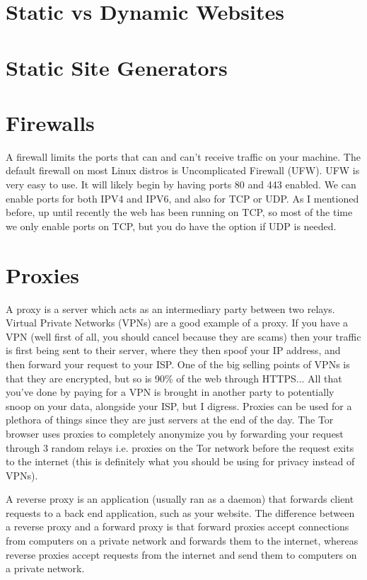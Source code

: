 \documentclass{article}
\begin{document}
\section{Static vs Dynamic Websites}

\section{Static Site Generators}

\section{Firewalls}

A firewall limits the ports that can and can't receive traffic on your machine. The default firewall on most
Linux distros is Uncomplicated Firewall (UFW). UFW is very easy to use. It will likely begin by having ports
80 and 443 enabled. We can enable ports for both IPV4 and IPV6, and also for TCP or UDP. As I mentioned before,
up until recently the web has been running on TCP, so most of the time we only enable ports on TCP, but you do
have the option if UDP is needed.

\section{Proxies}

A proxy is a server which acts as an intermediary party between two relays. Virtual Private Networks (VPNs) are
a good example of a proxy. If you have a VPN (well first of all, you should cancel because they are scams)
then your traffic is first being sent to their server, where they then spoof your IP address, and then forward
your request to your ISP. One of the big selling points of VPNs is that they are encrypted, but so is 90\%
of the web through HTTPS... All that you've done by paying for a VPN is brought in another party to potentially
snoop on your data, alongside your ISP, but I digress. Proxies can be used for a plethora of things since they
are just servers at the end of the day. The Tor browser uses proxies to completely anonymize you by forwarding
your request through 3 random relays i.e. proxies on the Tor network before the request exits to the internet
(this is definitely what you should be using for privacy instead of VPNs).

A reverse proxy is an application (usually ran as a daemon) that forwards client requests to a back end
application, such as your website. The difference between a reverse proxy and a forward proxy is that forward
proxies accept connections from computers on a private network and forwards them to the internet, whereas
reverse proxies accept requests from the internet and send them to computers on a private network.
\end{document}
